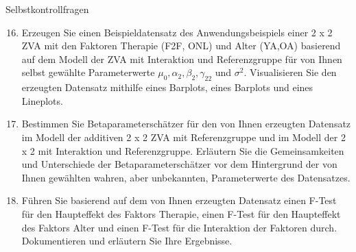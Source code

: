 \documentclass[
  8pt,
  ignorenonframetext,
]{beamer}
\begin{document}
\begin{frame}{Selbstkontrollfragen}
\protect\hypertarget{selbstkontrollfragen-1}{}
\footnotesize
\begin{enumerate}
\setcounter{enumi}{15}
\justifying
\item Erzeugen Sie einen Beispieldatensatz des Anwendungsbeispiels einer 2 x 2 ZVA 
mit den Faktoren Therapie (F2F, ONL) und Alter (YA,OA) basierend
auf dem Modell der ZVA mit Interaktion und Referenzgruppe für von Ihnen selbst gewählte
Parameterwerte $\mu_0,\alpha_2,\beta_2,\gamma_{22}$ und $\sigma^2$. Visualisieren
Sie den erzeugten Datensatz mithilfe eines Barplots, eines Barplots und eines Lineplots.
\item Bestimmen Sie Betaparameterschätzer für den von Ihnen erzeugten Datensatz im
Modell der additiven 2 x 2 ZVA mit Referenzgruppe und im Modell der 2 x 2 mit Interaktion und Referenzgruppe. 
Erläutern Sie die Gemeinsamkeiten und Unterschiede der Betaparameterschätzer vor dem
Hintergrund der von Ihnen gewählten wahren, aber unbekannten, Parameterwerte des Datensatzes.
\item Führen Sie basierend auf dem von Ihnen erzeugten Datensatz einen F-Test für den Haupteffekt
des Faktors Therapie, einen F-Test für den Haupteffekt des Faktors Alter und einen F-Test für
die Interaktion der Faktoren durch. Dokumentieren und erläutern Sie Ihre Ergebnisse.
\end{enumerate}
\end{frame}
\end{document}

